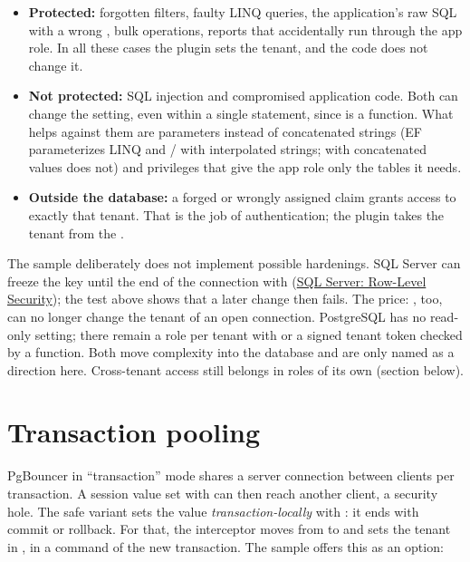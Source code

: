 \begin{itemize}
  \item \textbf{Protected:} forgotten filters, faulty LINQ queries, the application's raw SQL
    with a wrong , bulk operations, reports that accidentally run through the app
    role. In all these cases the plugin sets the tenant, and the code does not change it.
  \item \textbf{Not protected:} SQL injection and compromised application code. Both can change
    the setting, even within a single statement, since  is a
    function. What helps against them are parameters instead of concatenated strings (EF
    parameterizes LINQ and / with
    interpolated strings;  with concatenated values
    does not) and privileges that give the app role only the tables it needs.
  \item \textbf{Outside the database:} a forged or wrongly assigned claim grants access to
    exactly that tenant. That is the job of authentication; the plugin takes the tenant from
    the .
\end{itemize}

The sample deliberately does not implement possible hardenings. SQL Server can freeze the key
until the end of the connection with 
(\href{https://learn.microsoft.com/en-us/sql/relational-databases/security/row-level-security}{SQL Server: Row-Level Security});
the test above shows that a later change then fails. The price: ,
too, can no longer change the tenant of an open connection. PostgreSQL has no read-only setting;
there remain a role per tenant with  or a signed tenant token checked by a
 function. Both move complexity into the database and are only named as a
direction here. Cross-tenant access still belongs in roles of its own (section below).

\section{Transaction pooling}\label{sec:transaction-pooling}

PgBouncer in “transaction” mode shares a server connection between clients per transaction.
A session value set with
 can then reach another client, a security hole. The safe variant sets the value
\emph{transaction-locally} with
: it ends with commit or rollback. For that, the interceptor moves from
 to
 and sets the tenant in
, in a command of the new transaction. The sample offers
this as an option:

